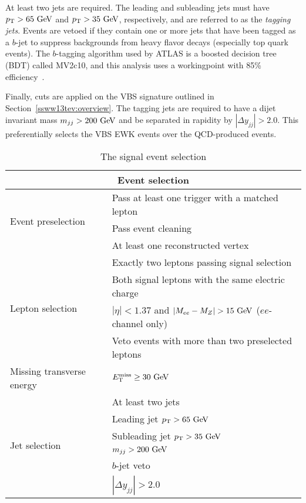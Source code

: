 At least two jets are required.
The leading and subleading jets must have $\pt > 65\gev$ and $\pt > 35\gev$, respectively, and are referred to as the \emph{tagging jets}.
Events are vetoed if they contain one or more jets that have been tagged as a $b$-jet to suppress backgrounds from heavy flavor decays (especially top quark events).
The $b$-tagging algorithm used by ATLAS is a boosted decision tree (BDT) called MV2c10, and this analysis uses a workingpoint with 85\% efficiency~\cite{2018.btag-efficiency-13tev}.

Finally, cuts are applied on the VBS signature outlined in Section~\ref{ssww13tev:overview}.
The tagging jets are required to have a dijet invariant mass $m_{jj} > 200\gev$ and be separated in rapidity by $|\Delta y_{jj}| > 2.0$.
This preferentially selects the VBS EWK events over the QCD-produced \ssww events.

\begin{table}[htbp]
  \centering
  \begin{tabular}{l | l}
    \multicolumn{2}{c}{Event selection} \\
    \hline\hline
    \multirow{3}{*}{Event preselection} & Pass at least one trigger with a matched lepton \\
                                        & Pass event cleaning \\
                                        & At least one reconstructed vertex\\
    \hline
    \multirow{4}{*}{Lepton selection}   & Exactly two leptons passing signal selection \\
                                        & Both signal leptons with the same electric charge \\
                                        & $|\eta| < 1.37$ and $|M_{ee} - M_Z| > 15\gev$ ($ee$-channel only) \\
                                        & Veto events with more than two preselected leptons \\
    \hline
    Missing transverse energy           & $\met \ge 30\gev$\\
    \hline
    \multirow{6}{*}{Jet selection}      & At least two jets \\
                                        & Leading jet $\pt > 65\gev$ \\
                                        & Subleading jet $\pt > 35\gev$\\
                                        & $m_{jj} > 200\gev$ \\
                                        & $b$-jet veto \\
                                        & $|\Delta y_{jj}| > 2.0$ \\
    \hline
  \end{tabular}
  \caption{The signal event selection}
  \label{tab:ssww13tev_event_selection}
\end{table}
